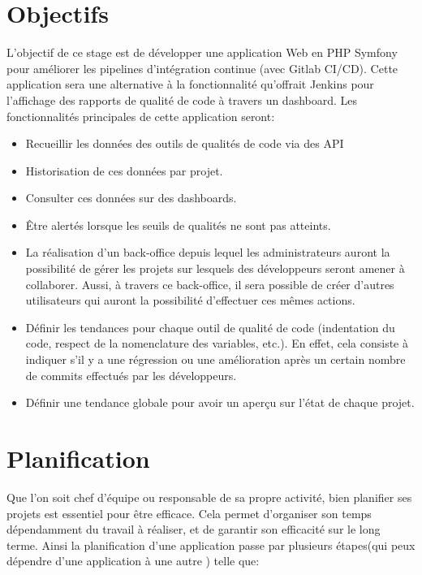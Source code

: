 	\section{Objectifs}
	L’objectif de ce stage est de développer une application Web en PHP Symfony pour améliorer les pipelines d’intégration continue (avec Gitlab CI/CD). Cette application sera une alternative à la fonctionnalité qu'offrait Jenkins pour l'affichage des rapports de qualité de code à travers un dashboard. Les fonctionnalités principales de cette application seront:
	\begin{itemize}
		\item Recueillir les données des outils de qualités de code via des API
		\item Historisation de ces données par projet.
		\item Consulter ces données sur des dashboards.
		\item Être alertés lorsque les seuils de qualités ne sont pas atteints.
		\item La réalisation d'un back-office depuis lequel les administrateurs auront la possibilité de gérer les projets sur lesquels des développeurs seront amener à collaborer. Aussi, à travers ce back-office, il sera possible de créer d'autres utilisateurs qui auront la possibilité d'effectuer ces mêmes actions.
		\item  Définir les tendances pour chaque outil de qualité de code (indentation du code, respect de la nomenclature des variables, etc.). En effet, cela consiste à indiquer s'il y a une régression ou une amélioration après un certain nombre de commits effectués par les développeurs.
		\item Définir une tendance globale pour avoir un aperçu sur l'état de chaque projet.
	\end{itemize}

	\section{Planification}
	Que l’on soit chef d’équipe ou responsable de sa propre activité, bien planifier ses projets est essentiel pour être efficace. Cela permet d’organiser son temps dépendamment du travail à réaliser, et de garantir son efficacité sur le long terme. Ainsi la planification d'une application passe par plusieurs étapes(qui peux dépendre d'une application à une autre ) telle que:\\
	
